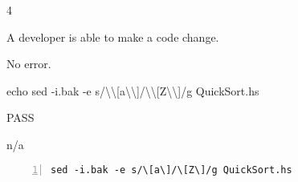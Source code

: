 \begin{description}[align=right,leftmargin=3.2cm,labelindent=3.0cm]
\item[Step:] 4
\item[Confirm:] A developer is able to make a code change.
\item[Expectation:] No error.
\item[Command:] echo sed  -i.bak -e s/\textbackslash\textbackslash[a\textbackslash\textbackslash]/\textbackslash\textbackslash[Z\textbackslash\textbackslash]/g QuickSort.hs
\item[Test Result:] PASS
\item[Evidence:] n/a
\end{description}
\begin{lstlisting}[numbers=left]
sed -i.bak -e s/\[a\]/\[Z\]/g QuickSort.hs

\end{lstlisting}
